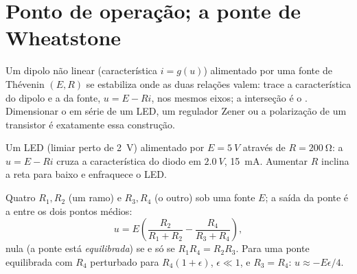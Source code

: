 \section{Ponto de operação; a ponte de Wheatstone}

\begin{method}\label{met:b1:dc-circuits:loadline}
Um dipolo não linear (característica $i = g(u)$) alimentado por uma fonte de
Thévenin $(E, R)$ se estabiliza onde as duas relações valem: trace a
característica do dipolo e a \emph{} da fonte, $u = E - Ri$, nos
mesmos eixos; a interseção é o \emph{}. Dimensionar
o  em série de um LED, um regulador Zener ou a polarização de um transistor
é exatamente essa construção.
\end{method}

\begin{omfigure}

{\small Um LED (limiar perto de \qty{2}{V}) alimentado por $E = \qty{5}{V}$
através de $R = \qty{200}{\ohm}$: a  $u = E - Ri$ cruza a
característica do diodo em $\qty{2.0}{V}$, \qty{15}{mA}. Aumentar $R$
inclina a reta para baixo e enfraquece o LED.}
\end{omfigure}

\begin{proposition}\label{prop:b1:dc-circuits:wheatstone}
Quatro  $R_1, R_2$ (um ramo) e $R_3, R_4$ (o outro) sob
uma fonte $E$; a saída da ponte é a  entre os dois
pontos médios:
\[
u = E\left(\frac{R_2}{R_1 + R_2} - \frac{R_4}{R_3 + R_4}\right),
\]
nula (a ponte está \emph{equilibrada}) se e só se $R_1R_4 = R_2R_3$. Para uma
ponte equilibrada com $R_4$ perturbado para $R_4(1 + \epsilon)$, $\epsilon
\ll 1$, e $R_3 = R_4$: $u \approx -E\epsilon/4$.
\end{proposition}

